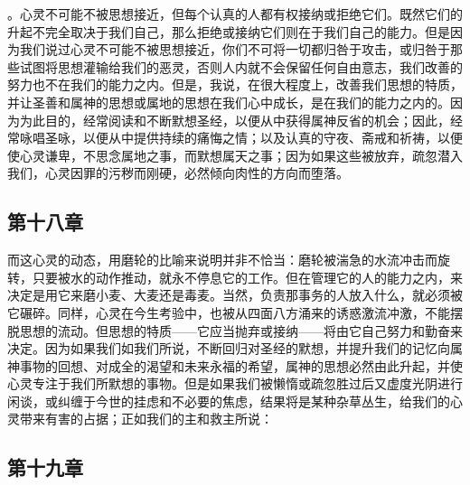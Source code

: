 。心灵不可能不被思想接近，但每个认真的人都有权接纳或拒绝它们。既然它们的升起不完全取决于我们自己，那么拒绝或接纳它们则在于我们自己的能力。但是因为我们说过心灵不可能不被思想接近，你们不可将一切都归咎于攻击，或归咎于那些试图将思想灌输给我们的恶灵，否则人内就不会保留任何自由意志，我们改善的努力也不在我们的能力之内。但是，我说，在很大程度上，改善我们思想的特质，并让圣善和属神的思想或属地的思想在我们心中成长，是在我们的能力之内的。因为为此目的，经常阅读和不断默想圣经，以便从中获得属神反省的机会；因此，经常咏唱圣咏，以便从中提供持续的痛悔之情；以及认真的守夜、斋戒和祈祷，以便使心灵谦卑，不思念属地之事，而默想属天之事；因为如果这些被放弃，疏忽潜入我们，心灵因罪的污秽而刚硬，必然倾向肉性的方向而堕落。\par


\subsection{第十八章}

\par

而这心灵的动态，用磨轮的比喻来说明并非不恰当：磨轮被湍急的水流冲击而旋转，只要被水的动作推动，就永不停息它的工作。但在管理它的人的能力之内，来决定是用它来磨小麦、大麦还是毒麦。当然，负责那事务的人放入什么，就必须被它碾碎。同样，心灵在今生考验中，也被从四面八方涌来的诱惑激流冲激，不能摆脱思想的流动。但思想的特质——它应当抛弃或接纳——将由它自己努力和勤奋来决定。因为如果我们如我们所说，不断回归对圣经的默想，并提升我们的记忆向属神事物的回想、对成全的渴望和未来永福的希望，属神的思想必然由此升起，并使心灵专注于我们所默想的事物。但是如果我们被懒惰或疏忽胜过后又虚度光阴进行闲谈，或纠缠于今世的挂虑和不必要的焦虑，结果将是某种杂草丛生，给我们的心灵带来有害的占据；正如我们的主和救主所说： \par


\subsection{第十九章}

\par

